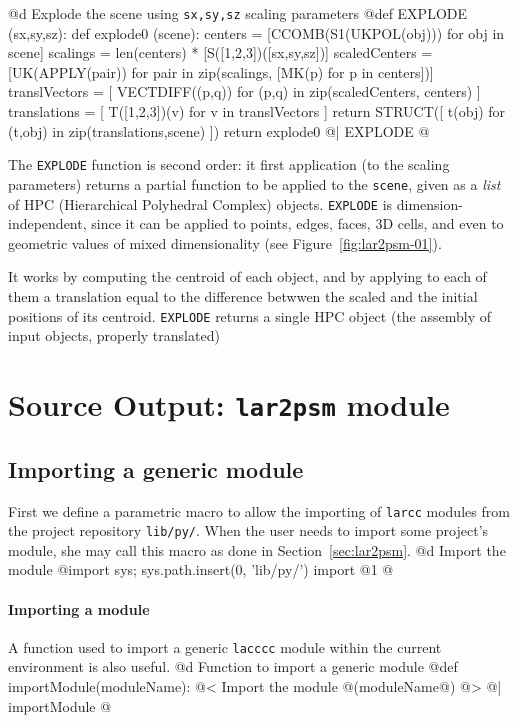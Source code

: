 \documentclass[11pt,oneside]{article}	%
\begin{document}
@d Explode the scene using \texttt{sx,sy,sz} scaling parameters
@{def EXPLODE (sx,sy,sz):
    def explode0 (scene):
        centers = [CCOMB(S1(UKPOL(obj))) for obj in scene]
        scalings = len(centers) * [S([1,2,3])([sx,sy,sz])]
        scaledCenters = [UK(APPLY(pair)) for pair in
                         zip(scalings, [MK(p) for p in centers])]
        translVectors = [ VECTDIFF((p,q)) for (p,q) in zip(scaledCenters, centers) ]
        translations = [ T([1,2,3])(v) for v in translVectors ]
        return STRUCT([ t(obj) for (t,obj) in zip(translations,scene) ])
    return explode0  
@| EXPLODE @}

The \texttt{EXPLODE} function is second order: it first application (to the scaling parameters) returns a partial function to be applied to the \texttt{scene}, given as a \emph{list} of HPC (Hierarchical Polyhedral Complex) objects. 
\texttt{EXPLODE} is dimension-independent, since it can be applied to points, edges, faces, 3D cells, and even to geometric values of mixed dimensionality (see Figure~\ref{fig:lar2psm-01}).

It works by computing the centroid of each object, and by applying to each of them a translation equal to the difference betwwen the scaled and the initial positions of its centroid. 
\texttt{EXPLODE}  returns a single HPC object (the assembly of input objects, properly translated)

\section{Source Output: \texttt{lar2psm} module}


\subsection{Importing a generic module}
First we define a parametric macro to allow the importing of \texttt{larcc} modules from the project repository \texttt{lib/py/}. When the user needs to import some project's module, she may call this macro as done in Section~\ref{sec:lar2psm}.
@d Import the module
@{import sys; sys.path.insert(0, 'lib/py/')
import @1
@}

\paragraph{Importing a module} A function used to import a generic \texttt{lacccc} module within the current environment is also useful.
@d Function to import a generic module
@{def importModule(moduleName):
	@< Import the module @(moduleName@) @>
@| importModule @}
\end{document}
